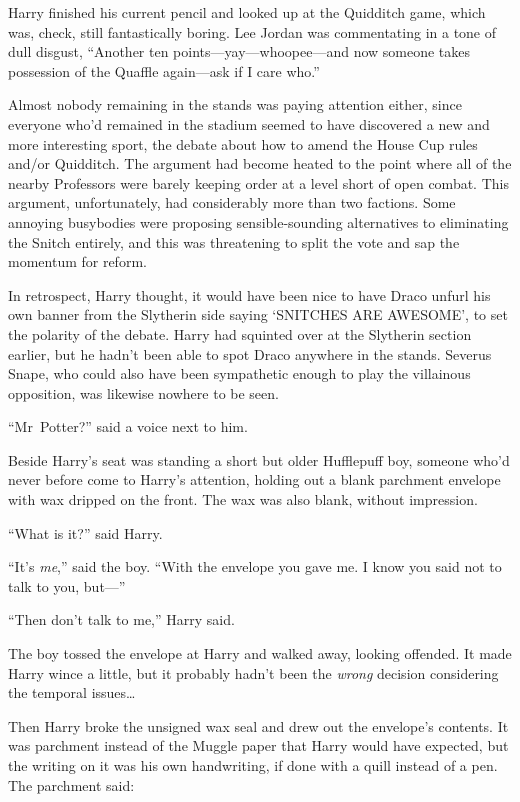Harry finished his current pencil and looked up at the Quidditch game, which was, check, still fantastically boring. Lee Jordan was commentating in a tone of dull disgust, “Another ten points—yay—whoopee—and now someone takes possession of the Quaffle again—ask if I care who.”

Almost nobody remaining in the stands was paying attention either, since everyone who’d remained in the stadium seemed to have discovered a new and more interesting sport, the debate about how to amend the House Cup rules and/or Quidditch. The argument had become heated to the point where all of the nearby Professors were barely keeping order at a level short of open combat. This argument, unfortunately, had considerably more than two factions. Some annoying busybodies were proposing sensible-sounding alternatives to eliminating the Snitch entirely, and this was threatening to split the vote and sap the momentum for reform.

In retrospect, Harry thought, it would have been nice to have Draco unfurl his own banner from the Slytherin side saying ‘SNITCHES ARE AWESOME’, to set the polarity of the debate. Harry had squinted over at the Slytherin section earlier, but he hadn’t been able to spot Draco anywhere in the stands. Severus Snape, who could also have been sympathetic enough to play the villainous opposition, was likewise nowhere to be seen.

“Mr~Potter?” said a voice next to him.

Beside Harry’s seat was standing a short but older Hufflepuff boy, someone who’d never before come to Harry’s attention, holding out a blank parchment envelope with wax dripped on the front. The wax was also blank, without impression.

“What is it?” said Harry.

“It’s \emph{me},” said the boy. “With the envelope you gave me. I know you said not to talk to you, but—”

“Then don’t talk to me,” Harry said.

The boy tossed the envelope at Harry and walked away, looking offended. It made Harry wince a little, but it probably hadn’t been the \emph{wrong} decision considering the temporal issues…

Then Harry broke the unsigned wax seal and drew out the envelope’s contents. It was parchment instead of the Muggle paper that Harry would have expected, but the writing on it was his own handwriting, if done with a quill instead of a pen. The parchment said:

